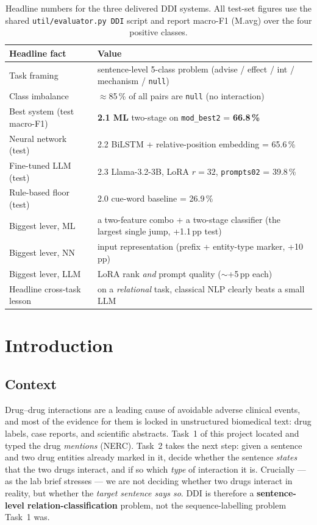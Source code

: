 \documentclass[a4paper,11pt]{article}
\begin{document}
\begin{table}[H]
\centering\small
\renewcommand{\arraystretch}{1.2}
\begin{tabular}{>{\columncolor{upclight}}l l}
\toprule
\textbf{Headline fact} & \textbf{Value} \\
\midrule
Task framing               & sentence-level 5-class problem (advise / effect / int / mechanism / \texttt{null}) \\
Class imbalance            & $\approx$85\,\% of all pairs are \texttt{null} (no interaction) \\
Best system (test macro-F1)& \textbf{2.1 ML} two-stage on \texttt{mod\_best2} = \textbf{66.8\,\%} \\
Neural network (test)      & 2.2 BiLSTM + relative-position embedding = 65.6\,\% \\
Fine-tuned LLM (test)      & 2.3 Llama-3.2-3B, LoRA $r{=}32$, \texttt{prompts02} = 39.8\,\% \\
Rule-based floor (test)    & 2.0 cue-word baseline = 26.9\,\% \\
Biggest lever, ML          & a two-feature combo + a two-stage classifier (the largest single jump, +1.1\,pp test) \\
Biggest lever, NN          & input representation (prefix + entity-type marker, +10\,pp) \\
Biggest lever, LLM         & LoRA rank \emph{and} prompt quality ($\sim$+5\,pp each) \\
Headline cross-task lesson & on a \emph{relational} task, classical NLP clearly beats a small LLM \\
\bottomrule
\end{tabular}
\caption{Headline numbers for the three delivered DDI systems. All test-set figures use the shared \texttt{util/evaluator.py~DDI} script and report macro-F1 (M.avg) over the four positive classes.}
\end{table}

\section{Introduction}

\subsection{Context}
Drug--drug interactions are a leading cause of avoidable adverse
clinical events, and most of the evidence for them is locked in
unstructured biomedical text: drug labels, case reports, and scientific
abstracts. Task~1 of this project located and typed the drug
\emph{mentions} (NERC). Task~2 takes the next step: given a sentence and
two drug entities already marked in it, decide whether the sentence
\emph{states} that the two drugs interact, and if so which \emph{type}
of interaction it is. Crucially --- as the lab brief stresses --- we are
not deciding whether two drugs interact in reality, but whether the
\emph{target sentence says so}. DDI is therefore a \textbf{sentence-level
relation-classification} problem, not the sequence-labelling problem
Task~1 was.
\end{document}
